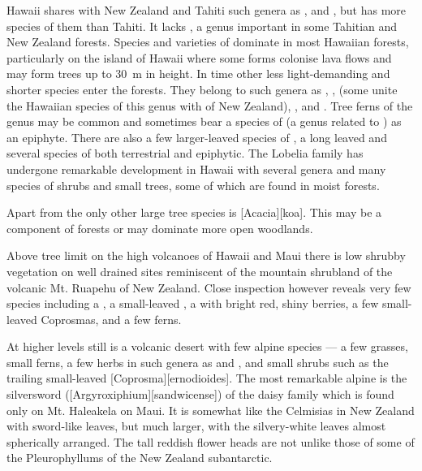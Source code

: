 Hawai{\okina}i shares with New Zealand and Tahiti such genera as ,  and , but has more species of them than Tahiti.
It lacks , a genus important in some Tahitian and New Zealand forests.
Species and varieties of  dominate in most Hawaiian forests, particularly on the island of Hawai{\okina}i where some forms colonise lava flows and may form trees up to \SI{30}{\metre} in height.
In time other less light-demanding and shorter species enter the forests.
They belong to such genera as , ,  (some unite the Hawaiian species of this genus with  of New Zealand), ,  and .
Tree ferns of the genus  may be common and sometimes bear a species of  (a genus related to ) as an epiphyte.
There are also a few larger-leaved species of , a long leaved  and several species of  both terrestrial and epiphytic.
The Lobelia family has undergone remarkable development in Hawai{\okina}i with several genera and many species of shrubs and small trees, some of which are found in moist forests.

Apart from  the only other large tree species is [Acacia][koa].
This may be a component of  forests or may dominate more open woodlands.

Above tree limit on the high volcanoes of Hawai{\okina}i and Maui there is low shrubby vegetation on well drained sites reminiscent of the mountain shrubland of the volcanic Mt.
Ruapehu of New Zealand.
Close inspection however reveals very few species including a , a small-leaved , a  with bright red, shiny berries, a few small-leaved Coprosmas, and a few ferns.

At higher levels still is a volcanic desert with few alpine species --- a few grasses, small ferns, a few herbs in such genera as  and , and small shrubs such as the trailing small-leaved [Coprosma][ernodioides].
The most remarkable alpine is the silversword ([Argyroxiphium][sandwicense]) of the daisy family which is found only on Mt.
Haleakela on Maui.
It is somewhat like the Celmisias in New Zealand with sword-like leaves, but much larger, with the silvery-white leaves almost spherically arranged.
The tall reddish flower heads are not unlike those of some of the Pleurophyllums of the New Zealand subantarctic.

